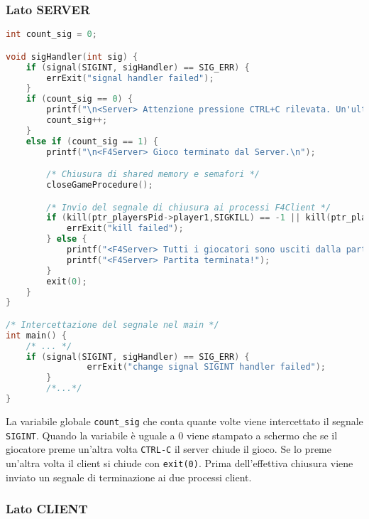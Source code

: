 \documentclass[a4paper,11pt]{article}
\begin{document}
\subsubsection*{Lato SERVER}
\begin{lstlisting}[language=C]
int count_sig = 0;

void sigHandler(int sig) {
    if (signal(SIGINT, sigHandler) == SIG_ERR) {
        errExit("signal handler failed");
    }
    if (count_sig == 0) {
        printf("\n<Server> Attenzione pressione CTRL+C rilevata. Un'ulteriore pressione comporta la chiusura del gioco!\n");
        count_sig++;
    }
    else if (count_sig == 1) {
        printf("\n<F4Server> Gioco terminato dal Server.\n");

        /* Chiusura di shared memory e semafori */
        closeGameProcedure();

        /* Invio del segnale di chiusura ai processi F4Client */
        if (kill(ptr_playersPid->player1,SIGKILL) == -1 || kill(ptr_playersPid->player2,SIGKILL) == -1 ) {
            errExit("kill failed");
        } else {
            printf("<F4Server> Tutti i giocatori sono usciti dalla partita!\n");
            printf("<F4Server> Partita terminata!");
        }
        exit(0);
    }
}

/* Intercettazione del segnale nel main */
int main() {
	/* ... */
	if (signal(SIGINT, sigHandler) == SIG_ERR) {
        		errExit("change signal SIGINT handler failed");
    	}
    	/*...*/
}	
\end{lstlisting}
La variabile globale \texttt{count\_sig} che conta quante volte viene intercettato il segnale \texttt{SIGINT}. Quando la variabile è uguale a 0 viene stampato a schermo che se il giocatore preme un’altra volta \texttt{CTRL-C} il server chiude il gioco. Se lo preme un'altra volta il client si chiude con \texttt{exit(0)}. Prima dell'effettiva chiusura viene inviato un segnale di terminazione ai due processi client. 

\subsubsection*{Lato CLIENT}
\end{document}
